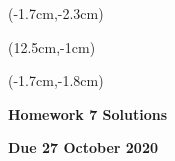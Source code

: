 \documentclass[12pt, oneside]{article}
\begin{document}
\begin{textblock*}{4cm}(-1.7cm,-2.3cm)
\end{textblock*}

\begin{textblock*}{8cm}(12.5cm,-1cm)
\end{textblock*}
\begin{textblock*}{13.5cm}(-1.7cm,-1.8cm)
\end{textblock*}

\vspace{1cm}

\begin{center}
\textbf{\Large Homework 7 Solutions}

\textbf{Due 27 October 2020}
\end{center}
\end{document}
